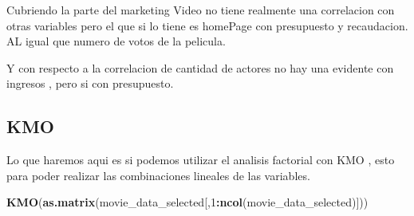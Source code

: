 \documentclass[
]{article}
\newenvironment{Shaded}{\begin{snugshade}}{\end{snugshade}}
\newcommand{\DecValTok}[1]{\textcolor[rgb]{0.00,0.00,0.81}{#1}}
\newcommand{\FunctionTok}[1]{\textcolor[rgb]{0.13,0.29,0.53}{\textbf{#1}}}
\newcommand{\NormalTok}[1]{#1}
\newcommand{\SpecialCharTok}[1]{\textcolor[rgb]{0.81,0.36,0.00}{\textbf{#1}}}
\begin{document}
Cubriendo la parte del marketing Video no tiene realmente una
correlacion con otras variables pero el que si lo tiene es homePage con
presupuesto y recaudacion. AL igual que numero de votos de la pelicula.

Y con respecto a la correlacion de cantidad de actores no hay una
evidente con ingresos , pero si con presupuesto.

\subsection{KMO}\label{kmo}

Lo que haremos aqui es si podemos utilizar el analisis factorial con KMO
, esto para poder realizar las combinaciones lineales de las variables.

\begin{Shaded}
\begin{Highlighting}[]
\FunctionTok{KMO}\NormalTok{(}\FunctionTok{as.matrix}\NormalTok{(movie\_data\_selected[,}\DecValTok{1}\SpecialCharTok{:}\FunctionTok{ncol}\NormalTok{(movie\_data\_selected)]))}
\end{Highlighting}
\end{Shaded}
\end{document}
